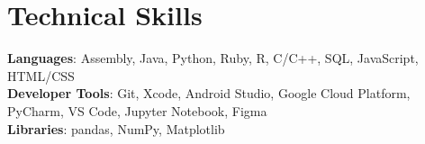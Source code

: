 \documentclass[letterpaper,11pt]{article}
\begin{document}

\section{Technical Skills}
 \begin{itemize}[leftmargin=0.15in, label={}]
    \small{\item{
     \textbf{Languages}{: Assembly, Java, Python, Ruby, R, C/C++, SQL, JavaScript, HTML/CSS} \\
     \textbf{Developer Tools}{: Git, Xcode, Android Studio, Google Cloud Platform, PyCharm, VS Code, Jupyter Notebook, Figma} \\
     \textbf{Libraries}{: pandas, NumPy, Matplotlib}
    }}
 \end{itemize}
\end{document}
